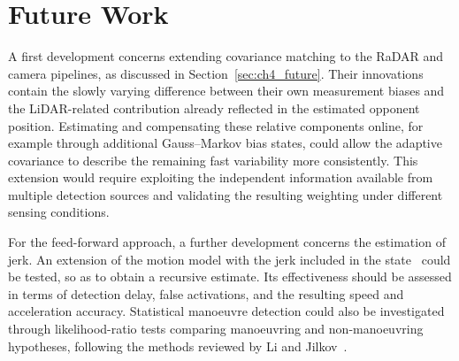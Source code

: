 \section{Future Work}
\label{sec:future_work}

A first development concerns extending covariance matching to the RaDAR and camera pipelines, as discussed in Section~\ref{sec:ch4_future}. Their innovations contain the slowly varying difference between their own measurement biases and the LiDAR-related contribution already reflected in the estimated opponent position. Estimating and compensating these relative components online, for example through additional Gauss--Markov bias states, could allow the adaptive covariance to describe the remaining fast variability more consistently. This extension would require exploiting the independent information available from multiple detection sources and validating the resulting weighting under different sensing conditions.

For the feed-forward approach, a further development concerns the estimation of jerk. An extension of the motion model with the jerk included in the state~\cite{li2003models} could be tested, so as to obtain a recursive estimate. Its effectiveness should be assessed in terms of detection delay, false activations, and the resulting speed and acceleration accuracy. Statistical manoeuvre detection could also be investigated through likelihood-ratio tests comparing manoeuvring and non-manoeuvring hypotheses, following the methods reviewed by Li and Jilkov~\cite{li2002decision}.

